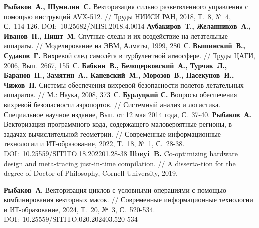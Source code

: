 \begin{thebibliography}{99}
%
\textbf{Рыбаков~А., Шумилин~С.} Векторизация сильно разветвленного управления с помощью инструкций AVX-512. // Труды НИИСИ РАН, 2018, Т.~8, №~4, С.~114-126. DOI:~10.25682/NIISI.2018.4.0014
%
\textbf{Аубакиров~Т., Желанников~А., Иванов~П., Ништ~М.} Спутные следы и их воздействие на летательные аппараты. // Моделирование на ЭВМ, Алматы, 1999, 280~С.
%
\textbf{Вышинский~В., Судаков~Г.} Вихревой след самолёта в турбулентной атмосфере. // Труды ЦАГИ, 2006, Вып.~2667, 155~С.
%
\textbf{Бабкин~В., Белоцерковский~А., Турчак~Л., Баранов~Н., Замятин~А., Каневский~М., Морозов~В., Пасекунов~И., Чижов~Н.} Системы обеспечения вихревой безопасности полетов летательных аппаратов. // М.: Наука, 2008, 373~С.
%
\textbf{Бурлуцкий С.} Вопросы обеспечения вихревой безопасности аэропортов. // Системный анализ и логистика. Специальное научное издание, Вып. от 12 мая 2014 года, С.~37-40.
%
\textbf{Рыбаков~А.} Векторизация программного кода, содержащего маловероятные регионы, в задачах вычислительной геометрии. // Современные информационные технологии и ИТ-образование, 2022, Т.~18, №~1, С.~28-38. DOI:~10.25559/SITITO.18.202201.28-38
%
\textbf{Ilbeyi~B.} Co-optimizing hardware design and meta-tracing just-in-time compilation. // A disserta-tion for the degree of Doctor of Philosophy, Cornell University, 2019.
%



%
\textbf{Рыбаков~А.} Векторизация циклов с условными операциями с помощью комбинирования векторных масок. // Современные информационные технологии и ИТ-образование, 2024, Т.~20, №~3, С.~520-534. DOI:~10.25559/SITITO.020.202403.520-534
%



%
%




\end{thebibliography}
